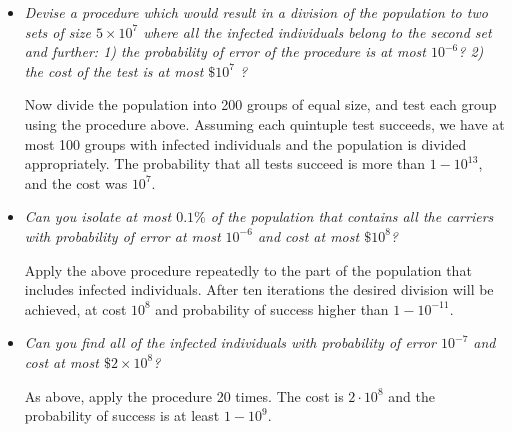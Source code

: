 \documentclass[11pt]{article} \usepackage{amssymb}
\begin{document}
\begin{itemize}
\item
{\em Devise a procedure which would result in a division of the population to two sets of size $5 \times 10^7$ where all the infected individuals belong to the second set and further: 1) the probability of error of the
procedure is at most $10^{-6}$? 2) the cost of the test is at most $\$  10^7 $ ?
}

Now divide the population into 200 groups of equal size, and test each group
using the procedure above. Assuming each quintuple test succeeds, we have at
most 100 groups with infected individuals and the population is divided
appropriately. The probability that all tests succeed is more than
$1-10^{13}$, and the cost was $10^7$.

\item
{\em Can you isolate at most $0.1\%$ of the population that contains all the carriers with probability of error at most $10^{-6}$
and cost at most $\$ 10^{8}$?
}

Apply the above procedure repeatedly to the part of the population that includes
infected individuals. After ten iterations the desired division will be
achieved, at cost $10^8$ and probability of success higher than $1-10^{-11}$.

\item
{\em Can you find all of the infected individuals with probability of error
$10^{-7}$
and cost at most $\$2 \times 10^{8}$?
}

As above, apply the procedure 20 times. The cost is $2\cdot 10^8$ and
the probability of success is at least $1-10^9$.

\end{itemize}
\end{document}
